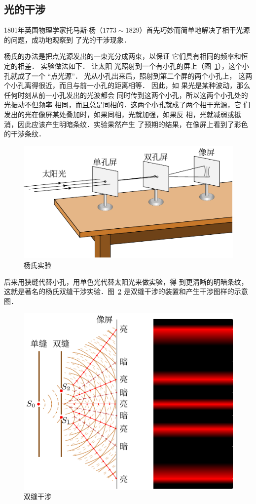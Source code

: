 \subsection{光的干涉}

1801年英国物理学家托马斯$\cdot$杨（$1773 \sim 1829$）首先巧妙而简单地解决了相干光源的问题，成功地观察到
了光的干涉现象．


杨氏的办法是把点光源发出的一束光分成两束，以保证
它们具有相同的频率和恒定的相差．
实验做法如下．
让太阳
光照射到一个有小孔的屏上（图~\ref{fig_C_6-1}），这个小孔就成了一个
“点光源”．
光从小孔出来后，照射到第二个屏的两个小孔上，
这两个小孔离得很近，而且与前一小孔的距离相等．
因此，如
果光是某种波动，那么任何时刻从前一小孔发出的光波都会
同时传到这两个小孔，所以这两个小孔处的光振动不但频率
相同，而且总是同相的．这两个小孔就成了两个相干光源，它
们发出的光在像屏某处叠加时，如果同相，光就加强，如果反
相，光就减弱或抵消，因此应该产生明暗条纹．实验果然产生
了预期的结果，在像屏上看到了彩色的干涉条纹．
\begin{figure}[htbp]
	\centering
	\includegraphics{fig/C/6-1.pdf}
	\caption{杨氏实验}\label{fig_C_6-1}
\end{figure}



后来用狭缝代替小孔，用单色光代替太阳光来做实验，得
到更清晰的明暗条纹，这就是著名的杨氏双缝干涉实验．图~\ref{fig_C_6-2} 
是双缝干涉的装置和产生干涉图样的示意图．
\begin{figure}[htbp]
    \centering
    \includegraphics{fig/C/6-2.pdf}
    \caption{双缝干涉}\label{fig_C_6-2}
\end{figure}



